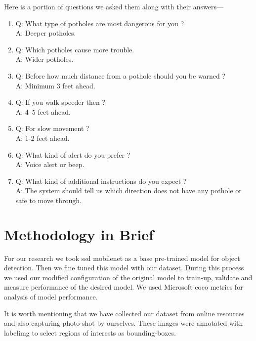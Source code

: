     Here is a portion of questions we asked them along with their answers---
    \begin{enumerate}
        \item{Q: What type of potholes are most dangerous for you ? \\
        A: Deeper potholes.}
        
        \item{Q: Which potholes cause more trouble. \\
        A: Wider potholes.}
        
        \item{Q: Before how much distance from a pothole should you be warned ?\\
        A: Minimum 3 feet ahead.}
        
        \item{Q: If you walk speeder then ?\\
        A: 4--5 feet ahead.}
        
        \item{Q: For slow movement ?\\
        A: 1-2 feet ahead.}
        
        \item{Q: What kind of alert do you prefer ?\\
        A: Voice alert or beep.}
        
        \item{Q: What kind of additional instructions do you expect ?\\
        A: The system should tell us which direction does not have any pothole or safe to move through.}
    \end{enumerate}
    
\section{Methodology in Brief}
    For our research we took \acrfull{ssd} \gls{mobilenet}\cite{liu2016ssd, howard2017mobilenets} as a base pre-trained model for object detection. Then we fine tuned this model with our dataset. During this process we used our modified configuration of the original model to train-up, validate and measure performance of the desired model. We used Microsoft \acrfull{coco} metrics\cite{lin2014microsoft} for analysis of model performance.
    
    It is worth mentioning that we have collected our dataset from online resources and also capturing photo-shot by ourselves. These images were annotated with \gls{labelimg}\cite{tzutalingit} to select regions of interests as bounding-boxes.
    
